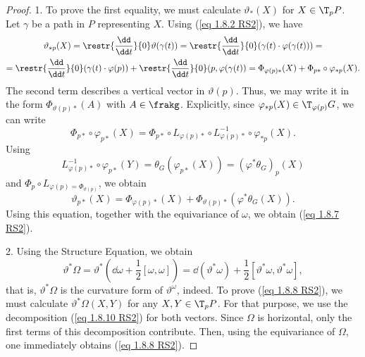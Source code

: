 \begin{proof}
    1. To prove the first equality, we must calculate $\vartheta_\ast(X)$ for $X\in \T_pP$. Let $\gamma$ be a path in $P$ representing $X$.  Using (\ref{eq 1.8.2 RS2}), we have
    \begin{multline}
        \vartheta_{\ast p}(X)=\restr{\frac{\dd}{\dd t}}{0}\vartheta(\gamma(t))=\restr{\frac{\dd}{\dd t}}{0} (\gamma(t)\cdot \varphi(\gamma(t)))=
        \\=\restr{\frac{\dd}{\dd t}}{0}(\gamma(t)\cdot \varphi(p))+\restr{\frac{\dd}{\dd t}}{0}(p,\varphi(\gamma(t))=\Phi_{\varphi(p)\ast}(X)+\Phi_{p\ast}\circ \varphi_{\ast p}(X).
    \end{multline}
    The second term describes a vertical vector in $\vartheta(p)$. Thus, we may write it in the form $\Phi_{\vartheta(p)\ast}(A)$ with $A\in\frakg$. Explicitly, since $\varphi_{\ast p}(X)\in \T_{\varphi(p)}G$, we can write
    \[\Phi_{p\ast}\circ \varphi_{p\ast }(X)=\Phi_{p\ast}\circ L_{\varphi(p)\ast}\circ L_{\varphi(p)\ast}^{-1}\circ \varphi_{\ast p}(X).\]
    Using
    \[L_{\varphi(p)\ast}^{-1}\circ \varphi_{p\ast}(Y)=\theta_G(\varphi_{p\ast}(X))=(\varphi^\ast\theta_G)_p(X)\]
    and $\Phi_p\circ L_{\varphi(p)=\Phi_{\vartheta(p)}}$, we obtain
    \[\vartheta_{p\ast}(X)=\Phi_{\varphi(p)\ast}(X)+\Phi_{\vartheta(p)\ast}(\varphi^\ast\theta_G(X)).\label{eq 1.8.10 RS2}\]
    Using this equation, together with the equivariance of $\omega$, we obtain (\ref{eq 1.8.7 RS2}).

    2. Using the Structure Equation, we obtain
    \[\vartheta^\ast\Omega=\vartheta^\ast\left(\dd \omega+\frac12[\omega,\omega]\right)=\dd(\vartheta^\ast\omega)+\frac12[\vartheta^\ast\omega,\vartheta^\ast\omega],\]
    that is, $\vartheta^\ast\Omega$ is the curvature form of $\vartheta^\omega$, indeed. To prove (\ref{eq 1.8.8 RS2}), we must calculate $\vartheta^\ast \Omega(X,Y)$ for any $X,Y\in \T_pP$. For that purpose, we use the decomposition (\ref{eq 1.8.10 RS2}) for both vectors. Since $\Omega$ is horizontal, only the first terms of this decomposition contribute. Then, using the equivariance of $\Omega$, one immediately obtains (\ref{eq 1.8.8 RS2}).
\end{proof}

